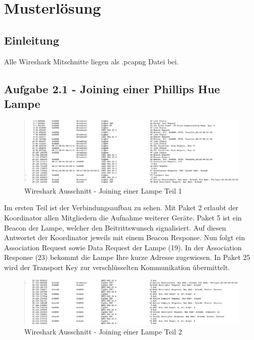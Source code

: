 \chapter{Musterlösung}
\section{Einleitung}
Alle Wireshark Mitschnitte liegen als \grqq *.pcapng\grqq{} Datei bei.

\section{Aufgabe 2.1 - Joining einer Phillips Hue Lampe}

\begin{figure}[H]
    \centering
    \includegraphics[width=1\textwidth]{media/lsg2.1-1.png}
    \caption{Wireshark Ausschnitt - Joining einer Lampe Teil 1}
\end{figure}

Im ersten Teil ist der Verbindungsaufbau zu sehen. Mit Paket 2 erlaubt der Koordinator
allen Mitgliedern die Aufnahme weiterer Geräte. Paket 5 ist ein Beacon der Lampe, welcher den Beitrittswunsch
signalisiert. Auf diesen Antwortet der Koordinator jeweils mit einem Beacon Response. Nun folgt ein Association
Request sowie Data Request der Lampe (19). In der Association Response (23) bekommt die Lampe
Ihre kurze Adresse zugewiesen. In Paket 25 wird der Transport Key zur verschlüsselten Kommunikation 
übermittelt.

\begin{figure}[H]
    \centering
    \includegraphics[width=1\textwidth]{media/lsg2.1-2.png}
    \caption{Wireshark Ausschnitt - Joining einer Lampe Teil 2}
\end{figure}

